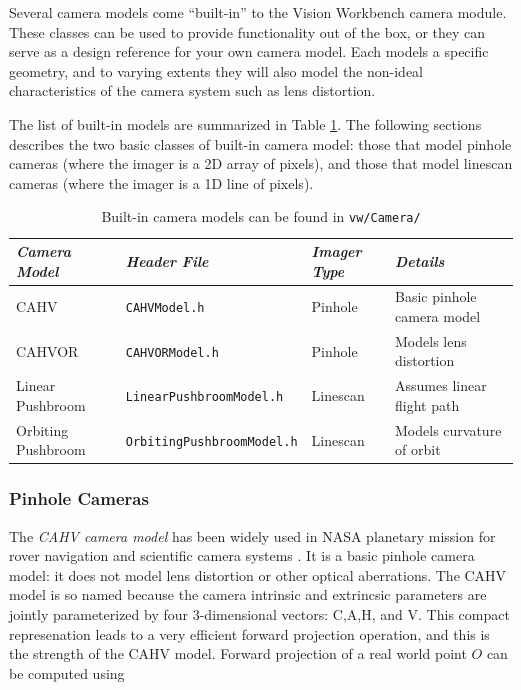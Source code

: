 Several camera models come ``built-in'' to the Vision Workbench camera
module.  These classes can be used to provide functionality out of the
box, or they can serve as a design reference for your own camera
model.  Each models a specific geometry, and to varying extents they
will also model the non-ideal characteristics of the camera system
such as lens distortion.  

The list of built-in models are summarized in Table
\ref{tab:camera-models}.  The following sections describes the two
basic classes of built-in camera model: those that model pinhole
cameras (where the imager is a 2D array of pixels), and those that
model linescan cameras (where the imager is a 1D line of pixels).

\begin{table}[tdp]
\begin{center}
\begin{tabular}{|l|l|l|l|}
\hline
{\em Camera Model} & {\em Header File} & {\em Imager Type} & {\em Details}\\
\hline CAHV         & {\tt CAHVModel.h} & Pinhole     & Basic pinhole camera model \\
CAHVOR       & {\tt CAHVORModel.h} & Pinhole     & Models lens distortion\\
Linear Pushbroom    & {\tt LinearPushbroomModel.h} & Linescan & Assumes linear flight path \\
Orbiting Pushbroom & {\tt OrbitingPushbroomModel.h} & Linescan & Models curvature of orbit \\
\hline
\end{tabular}
\end{center}
\label{tab:camera-models}
\caption{Built-in camera models can be found in {\tt vw/Camera/} }
\end{table}

\subsubsection{Pinhole Cameras}

The {\em CAHV camera model} has been widely used in NASA planetary mission
for rover navigation and scientific camera systems
\cite{yakimovsky78}.  It is a basic pinhole camera model: it does not
model lens distortion or other optical aberrations.  The CAHV model is
so named because the camera intrinsic and extrincsic parameters are
jointly parameterized by four 3-dimensional vectors: C,A,H, and V.
This compact represenation leads to a very efficient forward
projection operation, and this is the strength of the CAHV model.
Forward projection of a real world point $O$ can be computed using

